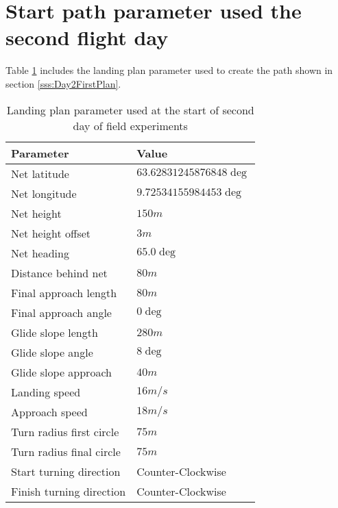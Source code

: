 \section{Start path parameter used the second flight day}\label{AP:SpecDay2}
Table \ref{AP:TB:landingDay2} includes the landing plan parameter used to create the path shown in section \ref{sss:Day2FirstPlan}.
\begin{table}[H]
\centering
\begin{tabular}{| p{4cm} | p{4cm} |}
\hline
\textbf{Parameter}			& \textbf{Value}			\\ \hline
Net latitude				& $63.62831245876848 \deg$ 	\\ \hline
Net longitude				& $9.72534155984453 \deg$ 	\\ \hline
Net height					& $150 m$					\\ \hline
Net height offset			& $3 m$ 	\\ \hline
Net heading					& $65.0 \deg$				\\ \hline
Distance behind net			& $80 m$					\\ \hline
Final approach length		& $80 m$					\\ \hline
Final approach angle		& $0 \deg$					\\ \hline
Glide slope length			& $280 m $					\\ \hline
Glide slope angle			& $8 \deg$					\\ \hline
Glide slope approach		& $40 m$					\\ \hline
Landing speed				& $16 m/s$					\\ \hline
Approach speed				& $18 m/s$					\\ \hline
Turn radius first circle	& $75 m$					\\ \hline
Turn radius final circle	& $75 m$					\\ \hline
Start turning direction		& Counter-Clockwise			\\ \hline
Finish turning direction	& Counter-Clockwise			\\ \hline
\end{tabular}
\caption{Landing plan parameter used at the start of second day of field experiments}
\label{AP:TB:landingDay2}
\end{table}